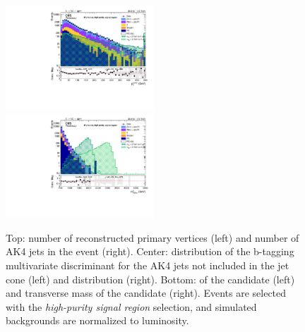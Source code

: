 \begin{figure}[!htb]
\begin{center}
    \includegraphics[width=0.495\textwidth]{plots/v9_U/XVZnnhpSR/X_pt.pdf}
    \includegraphics[width=0.495\textwidth]{plots/v9_U/XVZnnhpSR/X_tmass.pdf}

    \caption{Top: number of reconstructed primary vertices (left) and number of AK4 jets in the event (right). Center: distribution of the b-tagging multivariate discriminant for the AK4 jets not included in the \V jet cone (left) and \MET distribution (right). Bottom: \pt of the \VZ candidate (left) and transverse mass of the \VZ candidate (right). Events are selected with the \emph{high-purity signal region} selection, and simulated backgrounds are normalized to luminosity.}
\label{fig:plot_last}
  \end{center}
\end{figure}



